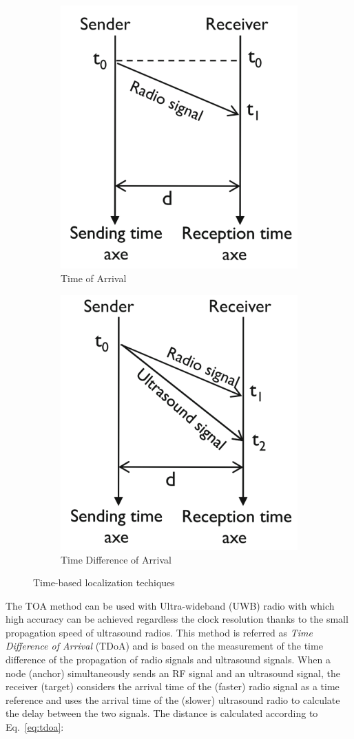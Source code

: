 \documentclass[a4paper,12pt]{article}
\begin{document}
\begin{enumerate}
\begin{enumerate}[label=(\roman*)]
    \begin{figure}[b]
    \centering
    \begin{subfigure}{.5\textwidth}
      \centering
      \includegraphics[width=.4\linewidth]{img/toa}
      \caption{Time of Arrival}
    \end{subfigure}%
    \begin{subfigure}{.5\textwidth}
      \centering
      \includegraphics[width=.4\linewidth]{img/tdoa}
      \caption{Time Difference of Arrival}
    \end{subfigure}
    \caption{Time-based localization techiques}
    \end{figure}

    The TOA method can be used with Ultra-wideband (UWB) radio with which high accuracy can be achieved regardless the clock resolution thanks to the small propagation speed of ultrasound radios. This method is referred as \textit{Time Difference of Arrival} (TDoA) and is based on the measurement of the time difference of the propagation of radio signals and ultrasound signals. When a node (anchor) simultaneously sends an RF signal and an ultrasound signal, the receiver (target) considers the arrival time of the (faster) radio signal as a time reference and uses the arrival time of the (slower) ultrasound radio to calculate the delay between the two signals. The distance is calculated according to Eq.~\ref{eq:tdoa}:


\end{enumerate}
\end{enumerate}
\end{document}
